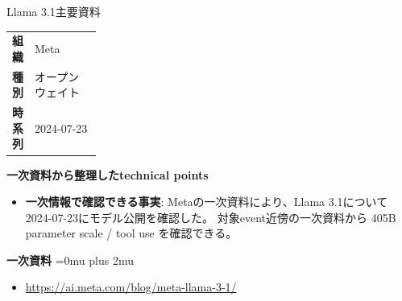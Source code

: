 \begin{technicalnote}{Llama 3.1}{主要資料}
\begingroup
\begin{tabularx}{\linewidth}{@{}>{\bfseries}p{0.22\linewidth}X@{}}
組織 & Meta \\
種別 & オープンウェイト \\
時系列 & 2024-07-23 \\
\end{tabularx}
\smallskip
{\bfseries 一次資料から整理したtechnical points}
\begin{itemize}[leftmargin=1.5em,itemsep=0.35em]
\item \textbf{一次情報で確認できる事実}: Metaの一次資料により、Llama 3.1について2024-07-23にモデル公開を確認した。 対象event近傍の一次資料から 405B parameter scale / tool use を確認できる。
\end{itemize}
\begin{minipage}{\linewidth}
\begin{samepage}
{\bfseries 一次資料}
\begingroup\sloppy
\Urlmuskip=0mu plus 2mu\relax
\begin{itemize}[leftmargin=1.5em,itemsep=0.25em]
\item {\scriptsize\url{https://ai.meta.com/blog/meta-llama-3-1/}}
\end{itemize}
\endgroup
\end{samepage}
\end{minipage}
\endgroup
\end{technicalnote}
\medskip

